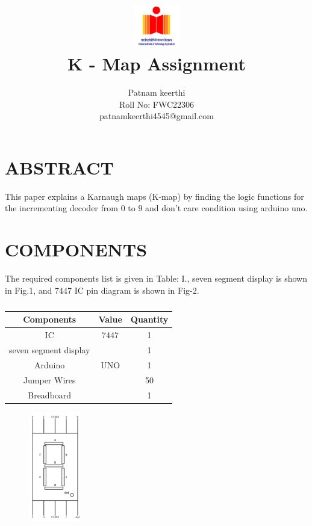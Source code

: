 \documentclass[conference]{IEEEtran}
\title{
\vspace{1cm}
{\includegraphics[width=0.15\textwidth]{iithlogo.jpg} \\ K - Map Assignment} }
\author{Patnam keerthi \\ Roll No: FWC22306 \\ patnamkeerthi4545@gmail.com}
\begin{document}
\maketitle
 \section {ABSTRACT}
 This paper explains a Karnaugh maps (K-map) by finding the logic functions for the incrementing decoder from $0$ to $9$ and don't care condition using arduino uno.

\section{COMPONENTS}
The required components list is given in Table: I., seven segment display is shown in Fig.1, and 7447 IC pin diagram is shown in Fig-2.
\vspace{0.3cm}
 \begin{table} [htbp]
\centering
\begin{tabular}{| c | c | c |} \hline
Components & Value & Quantity \\\hline
IC & 7447 & 1 \\ \hline
seven segment display & & 1\\ \hline
Arduino & UNO & 1 \\ \hline
Jumper Wires &  & 50 \\ \hline
Breadboard & & 1 \\ 
\hline
\end{tabular}
\vspace{0.3cm}
\caption{\label{tab:widgets}}
\end{table}

\begin{figure}[h]                           
\centering                                 
\includegraphics[width=0.2\textwidth]{fig1.jpg}                                           
\caption{\label{fig-1:Gates}}               
\end{figure}
\end{document}
